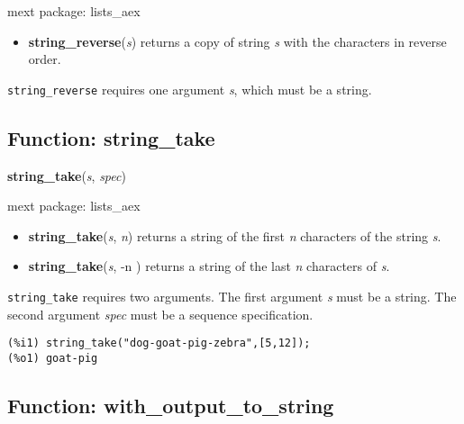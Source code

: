 \documentclass[]{article}
\begin{document}
\noindent mext package: lists\_aex



\vspace{5 pt}
\begin{itemize}
\item[] {\bf string\_reverse}({\it s})
  returns a copy of string {\it s} with the characters in reverse order. 

\end{itemize}
   {\tt string\_reverse} requires one argument {\it s}, which must be a string.


\vspace{5 pt}


\subsection{Function: string\_take\label{sec:string_take}}
\hypertarget{string_take}{}
{\bf string\_take}({\it s}, {\it spec})


\noindent mext package: lists\_aex



\vspace{5 pt}
\begin{itemize}
\item[] {\bf string\_take}({\it s}, {\it n})
  returns a string of the first {\it n} characters of the string {\it s}. 

\item[] {\bf string\_take}({\it s}, -n )
  returns a string of the last {\it n} characters of {\it s}. 

\end{itemize}
   {\tt string\_take} requires two arguments.
    The first argument {\it s} must be a string.
    The second argument {\it spec} must be a sequence specification.


\vspace{5 pt}


\begin{Verbatim}[frame=single]
(%i1) string_take("dog-goat-pig-zebra",[5,12]);
(%o1) goat-pig
\end{Verbatim}


\subsection{Function: with\_output\_to\_string\label{sec:with_output_to_string}}
\hypertarget{with_output_to_string}{}
\end{document}
